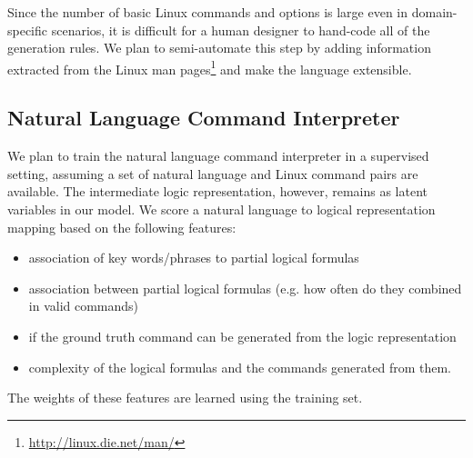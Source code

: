 Since the number of basic Linux commands and options is large even in domain-specific scenarios, it is difficult for a human designer to hand-code all of the generation rules. We plan to semi-automate this step by adding information extracted from the Linux man pages\footnote{\url{http://linux.die.net/man/}} and make the language extensible.

\subsection{Natural Language Command Interpreter}
We plan to train the natural language command interpreter in a supervised setting, assuming a set of natural language and Linux command pairs are available. The intermediate logic representation, however, remains as latent variables in our model. We score a natural language to logical representation mapping based on the following features:
\begin{itemize}\itemsep-1pt
	\item association of key words/phrases to partial logical formulas
	\item association between partial logical formulas (e.g. how often do they combined in valid commands)
	\item if the ground truth command can be generated from the logic representation
	\item complexity of the logical formulas and the commands generated from them.
\end{itemize}
The weights of these features are learned using the training set.